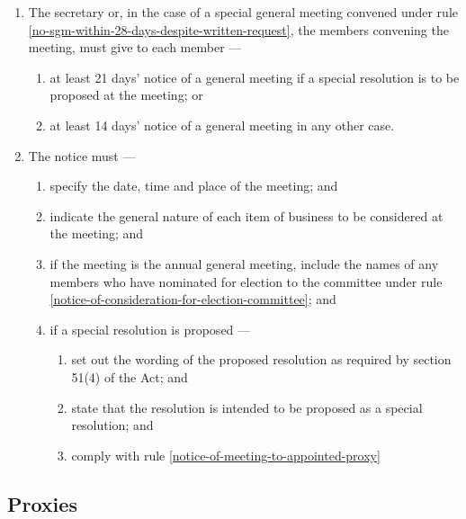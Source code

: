 \documentclass[../constitution.tex]{subfiles}
\begin{document}
\begin{enumerate}

\item The secretary or, in the case of a special general meeting convened under rule \ref{no-sgm-within-28-days-despite-written-request}, the members convening the meeting, must give to each member ---

  \begin{enumerate}
  
  \item at least 21 days' notice of a general meeting if a special resolution is to be proposed at the meeting; or
  \item at least 14 days' notice of a general meeting in any other case.
  \end{enumerate}
\item The notice must ---

  \begin{enumerate}
  
  \item specify the date, time and place of the meeting; and
  \item indicate the general nature of each item of business to be considered at the meeting; and
  \item if the meeting is the annual general meeting, include the names of any members who have nominated for election to the committee under rule \ref{notice-of-consideration-for-election-committee}; and
  \item if a special resolution is proposed ---

    \begin{enumerate}
    
    \item set out the wording of the proposed resolution as required by section 51(4) of the Act; and
    \item state that the resolution is intended to be proposed as a special resolution; and
    \item comply with rule \ref{notice-of-meeting-to-appointed-proxy}
    \end{enumerate}
  \end{enumerate}
\end{enumerate}

\hypertarget{proxies}{%
\subsection{Proxies}\label{proxies}}
\end{document}
